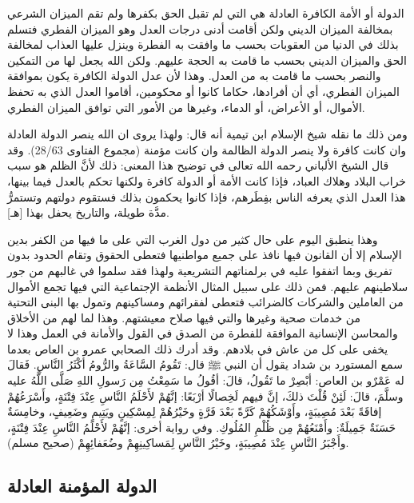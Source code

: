 الدولة أو الأمة الكافرة العادلة هي التي لم تقبل الحق بكفرها ولم تقم الميزان الشرعي بمخالفة الميزان الديني ولكن أقامت أدنى درجات العدل وهو الميزان الفطري فتسلم بذلك في الدنيا من العقوبات بحسب ما وافقت به الفطرة وينزل عليها العذاب لمخالفة الحق والميزان الديني بحسب ما قامت به الحجة عليهم. ولكن الله يجعل لها من التمكين والنصر بحسب ما قامت به من العدل. وهذا لأن عدل الدولة الكافرة يكون بموافقة الميزان الفطري، أي أن أفرادها، حكاما كانوا أو محكومين، أقاموا العدل الذي به تحفظ الأموال، أو الأعراض، أو الدماء، وغيرها من الأمور التي توافق الميزان الفطري. 

ومن ذلك ما نقله شيخ الإسلام ابن تيمية أنه قال: ولهذا يروى ان الله ينصر الدولة العادلة وان كانت كافرة ولا ينصر الدولة الظالمة وان كانت مؤمنة {\footnotesize (مجموع الفتاوى 28/63)}. وقد قال الشيخ الألباني رحمه الله تعالى في توضيح هذا المعنى: ذلك لأنَّ الظلم هو سبب خراب البلاد وهلاك العباد، فإذا كانت الأمة أو الدولة كافرة ولكنها تحكم بالعدل فيما بينها، هذا العدل الذي يعرفه الناس بفِطَرهم، فإذا كانوا يحكمون بذلك فستقوم دولتهم وتستمرُّ مدَّة طويلة، والتاريخ يحفل بهذا [هـ].

وهذا ينطبق اليوم على حال كثير من دول الغرب التي على ما فيها من الكفر بدين الإسلام إلا أن القانون فيها نافذ على جميع مواطنيها فتعطى الحقوق وتقام الحدود بدون تفريق وبما اتفقوا عليه في برلمناتهم التشريعية ولهذا فقد سلموا في غالبهم من جور سلاطينهم عليهم. فمن ذلك على سبيل المثال الأنظمة الإجتماعية التي فيها تجمع الأموال من العاملين والشركات كالضرائب فتعطى لفقرائهم ومساكينهم وتمول بها البنى التحتية من خدمات صحية وغيرها والتي فيها صلاح معيشتهم. وهذا لما لهم من الأخلاق والمحاسن الإنسانية الموافقة للفطرة من الصدق في القول والأمانة في العمل وهذا لا يخفى على كل من عاش في بلادهم. وقد أدرك ذلك الصحابي عمرو بن العاص بعدما سمع المستورد بن شداد يقول أن النبي ﷺ قال: تَقُومُ السَّاعَةُ والرُّومُ أكْثَرُ النَّاسِ. فَقالَ له عَمْرٌو بن العاص: أبْصِرْ ما تَقُولُ، قالَ: أقُولُ ما سَمِعْتُ مِن رَسولِ اللهِ صَلَّى اللَّهُ عليه وسلَّمَ، قالَ: لَئِنْ قُلْتَ ذلكَ، إنَّ فيهم لَخِصالًا أرْبَعًا: إنَّهُمْ لأَحْلَمُ النَّاسِ عِنْدَ فِتْنَةٍ، وأَسْرَعُهُمْ إفاقَةً بَعْدَ مُصِيبَةٍ، وأَوْشَكُهُمْ كَرَّةً بَعْدَ فَرَّةٍ وخَيْرُهُمْ لِمِسْكِينٍ ويَتِيمٍ وضَعِيفٍ، وخامِسَةٌ حَسَنَةٌ جَمِيلَةٌ: وأَمْنَعُهُمْ مِن ظُلْمِ المُلُوكِ. وفي رواية أخرى: إنَّهُمْ لأَحْلَمُ النَّاسِ عِنْدَ فِتْنَةٍ، وأَجْبَرُ النَّاسِ عِنْدَ مُصِيبَةٍ، وخَيْرُ النَّاسِ لِمَساكِينِهِمْ وضُعَفائِهِمْ {\footnotesize (صحيح مسلم)}.

\subsection{الدولة المؤمنة العادلة}


